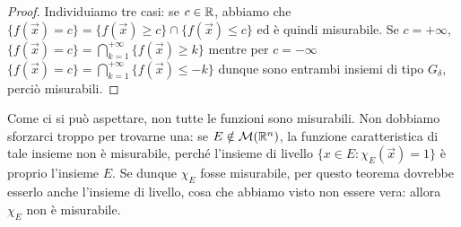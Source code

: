 \begin{proof}
	Individuiamo tre casi: se $c\in\mathbb{R}$, abbiamo che $\{f(\vec x)=c\}=\{f(\vec x)\geq c\}\cap\{f(\vec x)\leq c\}$ ed è quindi misurabile.
	Se $c=+\infty$, $\{f(\vec x)=c\}=\bigcap_{k=1}^{+\infty}\{f(\vec x)\geq k\}$ mentre per $c=-\infty$ $\{f(\vec x)=c\}=\bigcap_{k=1}^{+\infty}\{f(\vec x)\leq -k\}$ dunque sono entrambi insiemi di tipo $G_\delta$, perciò misurabili.
\end{proof}
Come ci si può aspettare, non tutte le funzioni sono misurabili.
Non dobbiamo sforzarci troppo per trovarne una: se $E\notin\mathcal M(\mathbb{R}^n)$, la funzione caratteristica di tale insieme non è misurabile, perch\'e l'insieme di livello $\{x\in E\colon \chi_E(\vec x)=1\}$ è proprio l'insieme $E$.
Se dunque $\chi_E$ fosse misurabile, per questo teorema dovrebbe esserlo anche l'insieme di livello, cosa che abbiamo visto non essere vera: allora $\chi_E$ non è misurabile.

